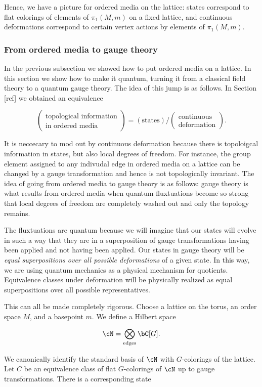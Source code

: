 Hence, we have a picture for ordered media on the lattice: states correspond to flat colorings of elements of $\pi_1(M,m)$ on a fixed lattice, and continuous deformations correspond to certain vertex actions by elements of $\pi_1(M,m)$.

\subsubsection{From ordered media to gauge theory}

In the previous subsection we showed how to put ordered media on a lattice. In this section we show how to make it quantum, turning it from a classical field theory to a quantum gauge theory. The idea of this jump is as follows. In Section [ref] we obtained an equivalence

$$
\left(\substack{\text{topological information}\\ \text{in ordered media}}\right)=\left(\text{states}\right)/\left(\substack{\text{continuous} \\ \text{deformation}}\right).
$$

It is neccecary to mod out by continuous deformation because there is topoloigcal information in states, but also local degrees of freedom. For instance, the group element assigned to any indivudal edge in ordered media on a lattice can be changed by a gauge transformation and hence is not topologically invariant. The idea of going from ordered media to gauge theory is as follows: gauge theory is what results from ordered media when quantum fluxtuations become so strong that local degrees of freedom are completely washed out and only the topology remains.

The fluxtuations are quantum because we will imagine that our states will evolve in such a way that they are in a superposition of gauge transformations having been applied and not having been applied. Our states in gauge theory will be \textit{equal superpositions over all possible deformations} of a given state. In this way, we are using quantum mechanics as a physical mechanism for quotients. Equivalence classes under deformation will be physically realized as equal superpositions over all possible representatives.

This can all be made completely rigorous. Choose a lattice on the torus, an order space $M$, and a basepoint $m$. We define a Hilbert space

$$\cN=\bigotimes_{\text{edges}}\bC[G].$$

We canonically identify the standard basis of $\cN$ with $G$-colorings of the lattice. Let $C$ be an equivalence class of flat $G$-colorings of $\cN$ up to gauge transformations. There is a corresponding state

